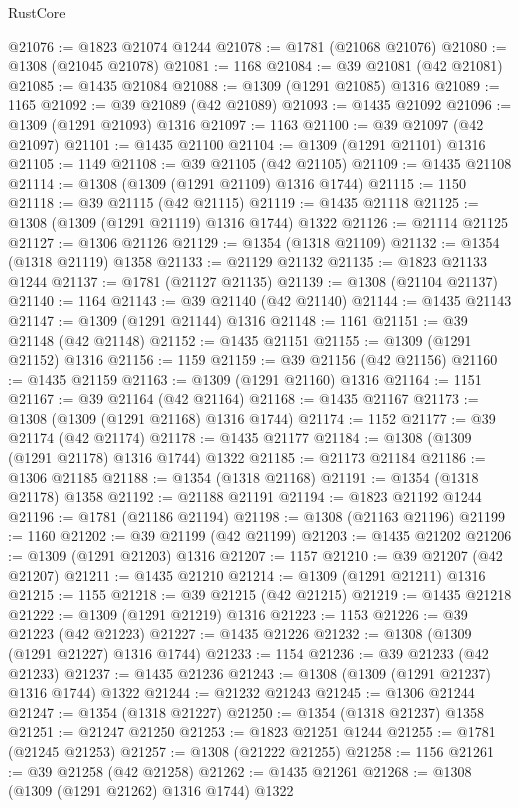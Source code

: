 \begin{lexlean}{RustCore}
\begin{coremodule}
@21076 := @1823 @21074 @1244
@21078 := @1781 (@21068 @21076)
@21080 := @1308 (@21045 @21078)
@21081 := 1168
@21084 := @39 @21081 (@42 @21081)
@21085 := @1435 @21084
@21088 := @1309 (@1291 @21085) @1316
@21089 := 1165
@21092 := @39 @21089 (@42 @21089)
@21093 := @1435 @21092
@21096 := @1309 (@1291 @21093) @1316
@21097 := 1163
@21100 := @39 @21097 (@42 @21097)
@21101 := @1435 @21100
@21104 := @1309 (@1291 @21101) @1316
@21105 := 1149
@21108 := @39 @21105 (@42 @21105)
@21109 := @1435 @21108
@21114 := @1308 (@1309 (@1291 @21109) @1316 @1744)
@21115 := 1150
@21118 := @39 @21115 (@42 @21115)
@21119 := @1435 @21118
@21125 := @1308 (@1309 (@1291 @21119) @1316 @1744) @1322
@21126 := @21114 @21125
@21127 := @1306 @21126
@21129 := @1354 (@1318 @21109)
@21132 := @1354 (@1318 @21119) @1358
@21133 := @21129 @21132
@21135 := @1823 @21133 @1244
@21137 := @1781 (@21127 @21135)
@21139 := @1308 (@21104 @21137)
@21140 := 1164
@21143 := @39 @21140 (@42 @21140)
@21144 := @1435 @21143
@21147 := @1309 (@1291 @21144) @1316
@21148 := 1161
@21151 := @39 @21148 (@42 @21148)
@21152 := @1435 @21151
@21155 := @1309 (@1291 @21152) @1316
@21156 := 1159
@21159 := @39 @21156 (@42 @21156)
@21160 := @1435 @21159
@21163 := @1309 (@1291 @21160) @1316
@21164 := 1151
@21167 := @39 @21164 (@42 @21164)
@21168 := @1435 @21167
@21173 := @1308 (@1309 (@1291 @21168) @1316 @1744)
@21174 := 1152
@21177 := @39 @21174 (@42 @21174)
@21178 := @1435 @21177
@21184 := @1308 (@1309 (@1291 @21178) @1316 @1744) @1322
@21185 := @21173 @21184
@21186 := @1306 @21185
@21188 := @1354 (@1318 @21168)
@21191 := @1354 (@1318 @21178) @1358
@21192 := @21188 @21191
@21194 := @1823 @21192 @1244
@21196 := @1781 (@21186 @21194)
@21198 := @1308 (@21163 @21196)
@21199 := 1160
@21202 := @39 @21199 (@42 @21199)
@21203 := @1435 @21202
@21206 := @1309 (@1291 @21203) @1316
@21207 := 1157
@21210 := @39 @21207 (@42 @21207)
@21211 := @1435 @21210
@21214 := @1309 (@1291 @21211) @1316
@21215 := 1155
@21218 := @39 @21215 (@42 @21215)
@21219 := @1435 @21218
@21222 := @1309 (@1291 @21219) @1316
@21223 := 1153
@21226 := @39 @21223 (@42 @21223)
@21227 := @1435 @21226
@21232 := @1308 (@1309 (@1291 @21227) @1316 @1744)
@21233 := 1154
@21236 := @39 @21233 (@42 @21233)
@21237 := @1435 @21236
@21243 := @1308 (@1309 (@1291 @21237) @1316 @1744) @1322
@21244 := @21232 @21243
@21245 := @1306 @21244
@21247 := @1354 (@1318 @21227)
@21250 := @1354 (@1318 @21237) @1358
@21251 := @21247 @21250
@21253 := @1823 @21251 @1244
@21255 := @1781 (@21245 @21253)
@21257 := @1308 (@21222 @21255)
@21258 := 1156
@21261 := @39 @21258 (@42 @21258)
@21262 := @1435 @21261
@21268 := @1308 (@1309 (@1291 @21262) @1316 @1744) @1322

\end{coremodule}
\end{lexlean}

